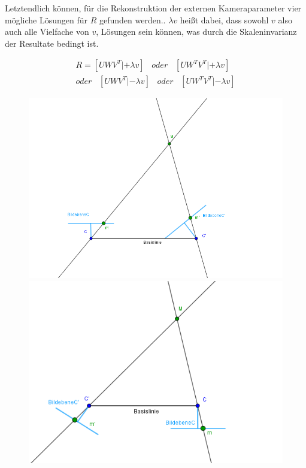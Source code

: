 Letztendlich können, für die Rekonstruktion der externen Kameraparameter vier mögliche Lösungen für $R$ gefunden werden.\cite{HZ,Ferid}. $\lambda v$ heißt dabei, dass sowohl $v$ also auch alle Vielfache von $v$, Lösungen sein können, was durch die Skaleninvarianz der Resultate bedingt ist\cite{HZ,Ferid}. 

\begin{gather}
R = [UWV^T|+\lambda v] \;\;\; \textit{oder} \;\;\;[UW^TV^T|+\lambda v]\\
\textit{oder}\;\;\; [UWV^T|-\lambda v] \;\;\; \textit{oder} \;\;\;[UW^TV^T|-\lambda v]
\end{gather}

\begin{figure}[!htb]
	\includegraphics[width=\linewidth]{images/P_Solution_one.png}
	\label{fig:awesome_image1}
	\endminipage\hfill
	\includegraphics[width=\linewidth]{images/P_Solution_two.png}
	\label{fig:awesome_image2}
	\endminipage\hfill
\end{figure}
